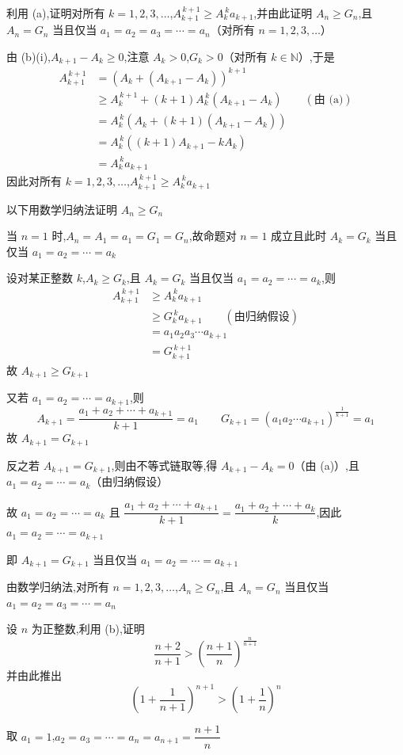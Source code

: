 \begin{questions}
\begin{parts}
\begin{subparts}
\subpart 利用 (a),证明对所有 $k=1,2,3,\ldots$,$A_{k+1}^{\,k+1}\geq A_k^{\,k}a_{k+1}$,并由此证明 $A_n\geq G_n$,且 $A_n=G_n$ 当且仅当 $a_1=a_2=a_3=\cdots=a_n$（对所有 $n=1,2,3,\ldots$）
\begin{solution}
由 (b)(i),$A_{k+1}-A_k\geq0$,注意 $A_k>0$,$G_k>0$（对所有 $k\in\mathbb{N}$）,于是
\begin{align*}
A_{k+1}^{\,k+1}&=\left(A_k+(A_{k+1}-A_k)\right)^{k+1}\\
&\geq A_k^{\,k+1}+(k+1)A_k^{\,k}(A_{k+1}-A_k)\qquad(\text{由 (a)})\\
&=A_k^{\,k}\left(A_k+(k+1)(A_{k+1}-A_k)\right)\\
&=A_k^{\,k}\left((k+1)A_{k+1}-kA_k\right)\\
&=A_k^{\,k}a_{k+1}
\end{align*}
因此对所有 $k=1,2,3,\ldots$,$A_{k+1}^{\,k+1}\geq A_k^{\,k}a_{k+1}$

以下用数学归纳法证明 $A_n\geq G_n$

当 $n=1$ 时,$A_n=A_1=a_1=G_1=G_n$,故命题对 $n=1$ 成立且此时 $A_k=G_k$ 当且仅当 $a_1=a_2=\cdots=a_k$

设对某正整数 $k$,$A_k\geq G_k$,且 $A_k=G_k$ 当且仅当 $a_1=a_2=\cdots=a_k$,则
\begin{align*}
A_{k+1}^{\,k+1}&\geq A_k^{\,k}a_{k+1}\\
&\geq G_k^{\,k}a_{k+1}\qquad(\text{由归纳假设})\\
&=a_1a_2a_3\cdots a_{k+1}\\
&=G_{k+1}^{\,k+1}
\end{align*}
故 $A_{k+1}\geq G_{k+1}$

又若 $a_1=a_2=\cdots=a_{k+1}$,则
\[
A_{k+1}=\frac{a_1+a_2+\cdots+a_{k+1}}{k+1}=a_1\qquad G_{k+1}=\left(a_1a_2\cdots a_{k+1}\right)^{\frac{1}{k+1}}=a_1
\]
故 $A_{k+1}=G_{k+1}$

反之若 $A_{k+1}=G_{k+1}$,则由不等式链取等,得 $A_{k+1}-A_k=0$（由 (a)）,且 $a_1=a_2=\cdots=a_k$（由归纳假设）

故 $a_1=a_2=\cdots=a_k$ 且 $\dfrac{a_1+a_2+\cdots+a_{k+1}}{k+1}=\dfrac{a_1+a_2+\cdots+a_k}{k}$,因此 $a_1=a_2=\cdots=a_{k+1}$

即 $A_{k+1}=G_{k+1}$ 当且仅当 $a_1=a_2=\cdots=a_{k+1}$

由数学归纳法,对所有 $n=1,2,3,\ldots$,$A_n\geq G_n$,且 $A_n=G_n$ 当且仅当 $a_1=a_2=a_3=\cdots=a_n$
\end{solution}

\subpart 设 $n$ 为正整数,利用 (b),证明
\[
\frac{n+2}{n+1}>\left(\frac{n+1}{n}\right)^{\frac{n}{n+1}}
\]
并由此推出
\[
\left(1+\frac{1}{n+1}\right)^{n+1}>\left(1+\frac{1}{n}\right)^{n}
\]
\begin{solution}
取 $a_1=1$,$a_2=a_3=\cdots=a_n=a_{n+1}=\dfrac{n+1}{n}$


\end{solution}
\end{subparts}
\end{parts}
\end{questions}
